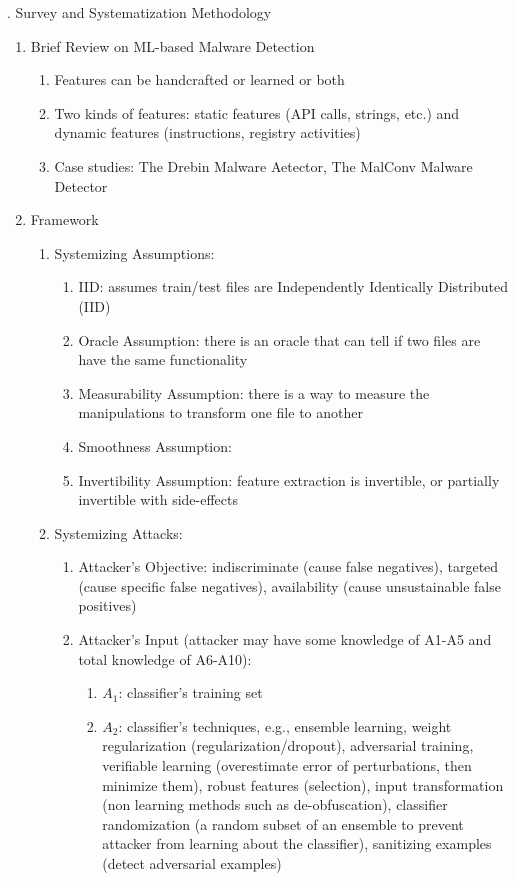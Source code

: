 \documentclass{article}
\begin{document}
. Survey and Systematization Methodology 
\begin{enumerate}
\item Brief Review on ML-based Malware Detection
	\begin{enumerate}
	\item Features can be handcrafted or learned or both
	\item Two kinds of features: static features (API calls, strings, etc.) and dynamic features (instructions, registry activities)
	\item Case studies: The Drebin Malware Aetector, The MalConv Malware Detector
	\end{enumerate}
\item Framework
	\begin{enumerate}
	\item Systemizing Assumptions:
		\begin{enumerate}
		\item IID: assumes train/test files are Independently Identically Distributed (IID)
		\item Oracle Assumption: there is an oracle that can tell if two files are have the same functionality
		\item Measurability Assumption: there is a way to measure the manipulations to transform one file to another
		\item Smoothness Assumption: 
		\item Invertibility Assumption: feature extraction is invertible, or partially invertible with side-effects
		\end{enumerate}
	\item Systemizing Attacks:
		\begin{enumerate}
		\item Attacker's Objective: indiscriminate (cause false negatives), targeted (cause specific false negatives), availability (cause unsustainable false positives)
		\item Attacker's Input (attacker may have some knowledge of A1-A5 and total knowledge of A6-A10):
			\begin{enumerate}
			\item $A_1$: classifier's training set
			\item $A_2$: classifier's techniques, e.g., ensemble learning, weight regularization (regularization/dropout), adversarial training, verifiable learning (overestimate error of perturbations, then minimize them), robust features (selection), input transformation (non learning methods such as de-obfuscation), classifier randomization (a random subset of an ensemble to prevent attacker from learning about the classifier), sanitizing examples (detect adversarial examples) 

\end{enumerate}
\end{enumerate}
\end{enumerate}
\end{enumerate}
\end{document}
